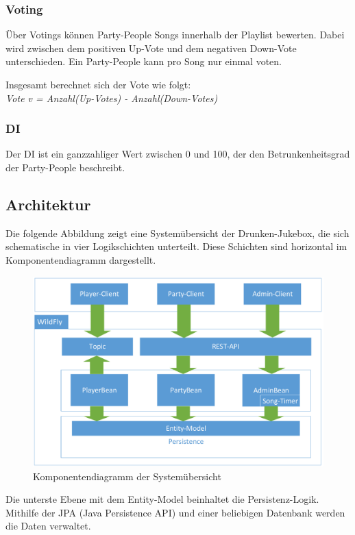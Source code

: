 \subsubsection{Voting}
Über Votings können Party-People Songs innerhalb der Playlist bewerten. Dabei wird zwischen dem positiven Up-Vote und dem negativen Down-Vote unterschieden. Ein Party-People kann pro Song nur einmal voten.

Insgesamt berechnet sich der Vote wie folgt:\\
\textit{Vote v = Anzahl(Up-Votes) - Anzahl(Down-Votes)}

\subsubsection{DI}
Der DI ist ein ganzzahliger Wert zwischen 0 und 100, der den Betrunkenheitsgrad der Party-People beschreibt.

\subsection{Architektur}

Die folgende Abbildung zeigt eine Systemübersicht der Drunken-Jukebox, die sich schematische in vier Logikschichten unterteilt. Diese Schichten sind horizontal im Komponentendiagramm dargestellt.

\begin{figure}[H]
	\centering
	\includegraphics[width=1\linewidth]{Bilder/Komponentendiagramm_praesi}
	\caption{Komponentendiagramm der Systemübersicht }
	\label{fig:Komponentendiagramm}
\end{figure}

Die unterste Ebene mit dem Entity-Model beinhaltet die Persistenz-Logik. Mithilfe der JPA (Java Persistence API) und einer beliebigen Datenbank werden die Daten verwaltet.

